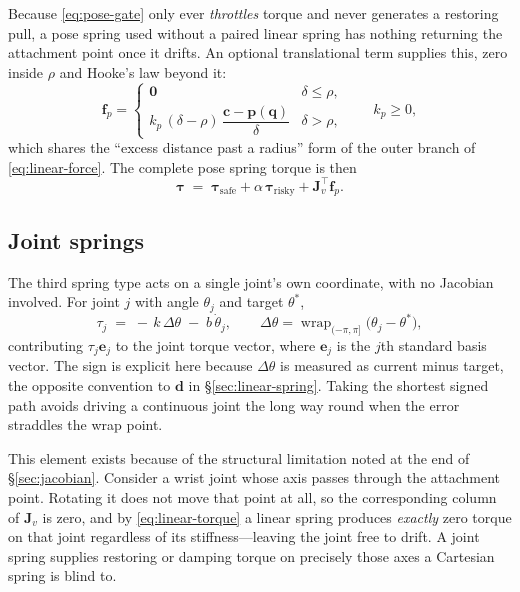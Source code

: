 Because \eqref{eq:pose-gate} only ever \emph{throttles} torque and never
generates a restoring pull, a pose spring used without a paired linear spring
has nothing returning the attachment point once it drifts. An optional
translational term supplies this, zero inside $\rho$ and Hooke's law beyond it:
%
\begin{equation}
  \bm{f}_{p} =
  \begin{cases}
    \bm{0} & \delta \le \rho, \\[4pt]
    k_{p}\,(\delta - \rho)\,\dfrac{\bm{c} - \bm{p}(\bm{q})}{\delta}
           & \delta > \rho,
  \end{cases}
  \qquad k_{p} \ge 0,
  \label{eq:pose-position-force}
\end{equation}
%
which shares the ``excess distance past a radius'' form of the outer branch of
\eqref{eq:linear-force}. The complete pose spring torque is then
%
\begin{equation}
  \boxed{\;\bm{\tau} \;=\; \bm{\tau}_{\mathrm{safe}}
                        + \alpha\,\bm{\tau}_{\mathrm{risky}}
                        + \bm{J}_{v}^{\top}\bm{f}_{p}.\;}
  \label{eq:pose-torque}
\end{equation}

\subsection{Joint springs}
\label{sec:joint-spring}

The third spring type acts on a single joint's own coordinate, with no
Jacobian involved. For joint $j$ with angle $\theta_{j}$ and target
$\theta^{*}$,
%
\begin{equation}
  \boxed{\;\tau_{j} \;=\; -\,k\,\Delta\theta \;-\; b\,\dot{\theta}_{j},
  \qquad
  \Delta\theta = \operatorname{wrap}_{(-\pi,\pi]}\!\bigl(\theta_{j}
                 - \theta^{*}\bigr),\;}
  \label{eq:joint-torque}
\end{equation}
%
contributing $\tau_{j}\bm{e}_{j}$ to the joint torque vector, where
$\bm{e}_{j}$ is the $j$th standard basis vector. The sign is explicit here
because $\Delta\theta$ is measured as current minus target, the opposite
convention to $\bm{d}$ in \S\ref{sec:linear-spring}. Taking the shortest signed
path avoids driving a continuous joint the long way round when the error
straddles the wrap point.

This element exists because of the structural limitation noted at the end of
\S\ref{sec:jacobian}. Consider a wrist joint whose axis passes through the
attachment point. Rotating it does not move that point at all, so the
corresponding column of $\bm{J}_{v}$ is zero, and by
\eqref{eq:linear-torque} a linear spring produces \emph{exactly} zero torque on
that joint regardless of its stiffness---leaving the joint free to drift. A
joint spring supplies restoring or damping torque on precisely those axes a
Cartesian spring is blind to.

